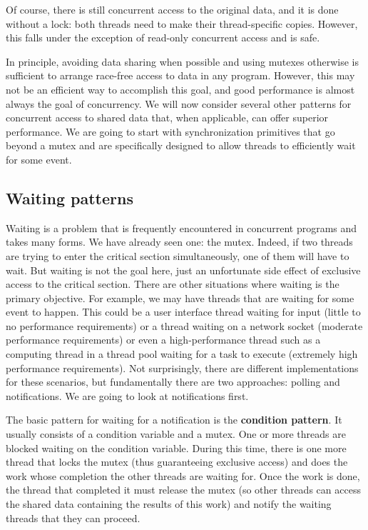 Of course, there is still concurrent access to the original data, and it is done without a lock: both threads need to make their thread-specific copies. However, this falls under the exception of read-only concurrent access and is safe.

In principle, avoiding data sharing when possible and using mutexes otherwise is sufficient to arrange race-free access to data in any program. However, this may not be an efficient way to accomplish this goal, and good performance is almost always the goal of concurrency. We will now consider several other patterns for concurrent access to shared data that, when applicable, can offer superior performance. We are going to start with synchronization primitives that go beyond a mutex and are specifically designed to allow threads to efficiently wait for some event.

\subsection{Waiting patterns}

Waiting is a problem that is frequently encountered in concurrent programs and takes many forms. We have already seen one: the mutex. Indeed, if two threads are trying to enter the critical section simultaneously, one of them will have to wait. But waiting is not the goal here, just an unfortunate side effect of exclusive access to the critical section. There are other situations where waiting is the primary objective. For example, we may have threads that are waiting for some event to happen. This could be a user interface thread waiting for input (little to no performance requirements) or a thread waiting on a network socket (moderate performance requirements) or even a high-performance thread such as a computing thread in a thread pool waiting for a task to execute (extremely high performance requirements). Not surprisingly, there are different implementations for these scenarios, but fundamentally there are two approaches: polling and notifications. We are going to look at notifications first.

The basic pattern for waiting for a notification is the \textbf{condition pattern}. It usually consists of a condition variable and a mutex. One or more threads are blocked waiting on the condition variable. During this time, there is one more thread that locks the mutex (thus guaranteeing exclusive access) and does the work whose completion the other threads are waiting for. Once the work is done, the thread that completed it must release the mutex (so other threads can access the shared data containing the results of this work) and notify the waiting threads that they can proceed.

